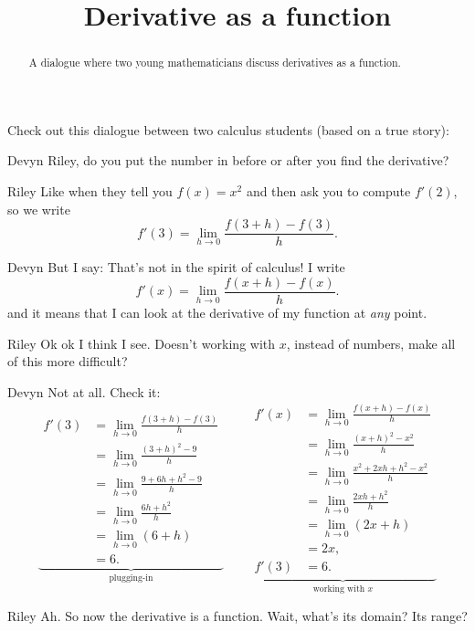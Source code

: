 \documentclass{ximera}
\title[Break-Ground:]{Derivative as a function}
\begin{document}
\begin{abstract}
A dialogue where two young mathematicians discuss derivatives as a function.
\end{abstract}
\maketitle

Check out this dialogue between two calculus students (based on a true
story):

\begin{dialogue}
\item[Devyn] Riley, do you put the number in before or after you find
  the derivative?
\item[Riley] Like when they tell you $f(x) = x^2$ and then ask you to
  compute $f'(2)$, so we write
  \[
  f'(3) = \lim_{h\to 0}\frac{f(3+h)-f(3)}{h}.
  \]
\item[Devyn] But I say: That's not in the spirit of calculus! I
  write
  \[
  f'(x) = \lim_{h\to 0}\frac{f(x+h)-f(x)}{h}.
  \]
  and it means that I can look at the derivative of my function at
  \textit{any} point.
\item[Riley] Ok ok I think I see. Doesn't working with $x$, instead of
  numbers, make all of this more difficult?
\item[Devyn] Not at all. Check it:
  \[
 \underbrace{\begin{aligned}
    f'(3) &= \lim_{h\to 0}\frac{f(3+h)-f(3)}{h}\\
    &= \lim_{h\to 0}\frac{(3+h)^2-9}{h}\\
    &= \lim_{h\to 0}\frac{9+6h+h^2-9}{h}\\
    &= \lim_{h\to 0}\frac{6h+h^2}{h}\\
    &= \lim_{h\to 0}(6+h)\\
    &= 6.
  \end{aligned}}_{\text{plugging-in}}
  \qquad
  \underbrace{\begin{aligned}
    f'(x) &= \lim_{h\to 0}\frac{f(x+h)-f(x)}{h}\\
    &= \lim_{h\to 0}\frac{(x+h)^2-x^2}{h}\\
    &= \lim_{h\to 0}\frac{x^2+2xh+h^2-x^2}{h}\\
    &= \lim_{h\to 0}\frac{2xh+h^2}{h}\\
    &= \lim_{h\to 0}(2x+h)\\
    &= 2x,\\
    f'(3) &=6. 
  \end{aligned}}_{\text{working with $x$}}
  \]
  \item[Riley] Ah. So now the derivative is a function. Wait, what's
    its domain? Its range?
\end{dialogue}
\end{document}
